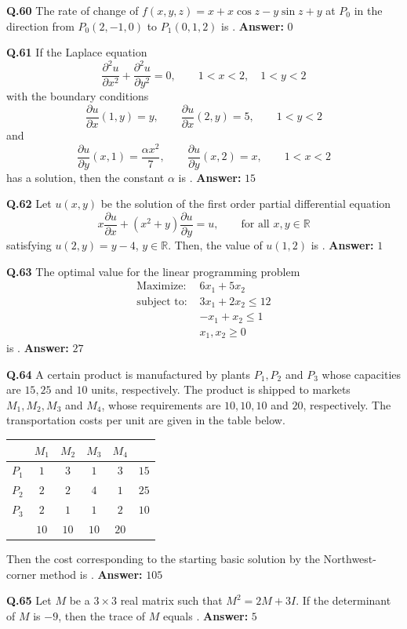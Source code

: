 \documentclass[11pt,a4paper]{article}
\newcommand{\ans}[1]{\textbf{Answer:} #1\par\medskip}
\begin{document}
\textbf{Q.60} The rate of change of $f(x, y, z) = x + x\cos z - y\sin z + y$ at $P_0$ in the direction from $P_0(2, -1, 0)$ to $P_1(0, 1, 2)$ is \underline{\hspace{2cm}}.
\ans{$0$}

\textbf{Q.61} If the Laplace equation
\[
  \frac{\partial^2 u}{\partial x^2} + \frac{\partial^2 u}{\partial y^2} = 0, \qquad 1 < x < 2,\quad 1 < y < 2
\]
with the boundary conditions
\[
  \frac{\partial u}{\partial x}(1, y) = y, \qquad \frac{\partial u}{\partial x}(2, y) = 5, \qquad 1 < y < 2
\]
and
\[
  \frac{\partial u}{\partial y}(x, 1) = \frac{\alpha x^2}{7}, \qquad \frac{\partial u}{\partial y}(x, 2) = x, \qquad 1 < x < 2
\]
has a solution, then the constant $\alpha$ is \underline{\hspace{2cm}}.
\ans{$15$}

\textbf{Q.62} Let $u(x, y)$ be the solution of the first order partial differential equation
\[
  x\frac{\partial u}{\partial x} + (x^2 + y)\frac{\partial u}{\partial y} = u, \qquad \text{for all } x, y \in \mathbb{R}
\]
satisfying $u(2, y) = y - 4$, $y \in \mathbb{R}$. Then, the value of $u(1, 2)$ is \underline{\hspace{2cm}}.
\ans{$1$}

\textbf{Q.63} The optimal value for the linear programming problem
\begin{align*}
  \text{Maximize: } & 6x_1 + 5x_2 \\
  \text{subject to: } & 3x_1 + 2x_2 \le 12 \\
                      & -x_1 + x_2 \le 1 \\
                      & x_1, x_2 \ge 0
\end{align*}
is \underline{\hspace{2cm}}.
\ans{$27$}

\textbf{Q.64} A certain product is manufactured by plants $P_1, P_2$ and $P_3$ whose capacities are $15, 25$ and $10$ units, respectively. The product is shipped to markets $M_1, M_2, M_3$ and $M_4$, whose requirements are $10, 10, 10$ and $20$, respectively. The transportation costs per unit are given in the table below.
\begin{center}
\begin{tabular}{c|cccc|c}
 & $M_1$ & $M_2$ & $M_3$ & $M_4$ & \\
\hline
$P_1$ & $1$ & $3$ & $1$ & $3$ & $15$ \\
\hline
$P_2$ & $2$ & $2$ & $4$ & $1$ & $25$ \\
\hline
$P_3$ & $2$ & $1$ & $1$ & $2$ & $10$ \\
\hline
 & $10$ & $10$ & $10$ & $20$ &
\end{tabular}
\end{center}
Then the cost corresponding to the starting basic solution by the Northwest-corner method is \underline{\hspace{2cm}}.
\ans{$105$}

\textbf{Q.65} Let $M$ be a $3 \times 3$ real matrix such that $M^2 = 2M + 3I$. If the determinant of $M$ is $-9$, then the trace of $M$ equals \underline{\hspace{2cm}}.
\ans{$5$}
\end{document}

